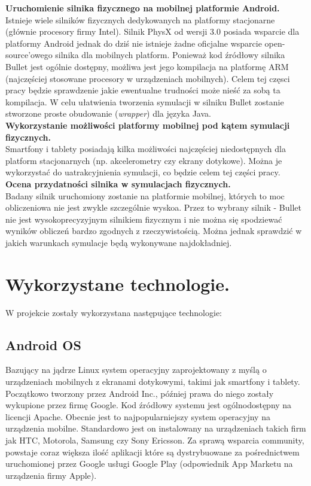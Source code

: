 \textbf{Uruchomienie silnika fizycznego na mobilnej platformie Android.}\\
Istnieje wiele silników fizycznych dedykowanych na platformy
stacjonarne (głównie procesory firmy Intel). Silnik PhysX od wersji 3.0
posiada wsparcie dla platformy Android jednak do dziś nie istnieje żadne
oficjalne wsparcie open-source'owego silnika dla mobilnych platform. Ponieważ
kod źródłowy silnika Bullet jest ogólnie dostępny, możliwa jest jego kompilacja
na platformę ARM (najczęściej stosowane procesory w urządzeniach mobilnych).
Celem tej częsci pracy będzie sprawdzenie jakie ewentualne trudności może nieść
za sobą ta kompilacja. W celu ułatwienia tworzenia symulacji w silniku Bullet
zostanie stworzone proste obudowanie (\emph{wrapper}) dla języka Java.\\

\textbf{Wykorzystanie możliwości platformy mobilnej pod kątem symulacji
fizycznych.}\\ Smartfony i tablety posiadają kilka możliwości
najczęściej niedostępnych dla platform stacjonarnych (np. akcelerometry czy
ekrany dotykowe). Można je wykorzystać do uatrakcyjnienia symulacji, co
będzie celem tej części pracy.\\

\textbf{Ocena przydatności silnika w symulacjach fizycznych.}\\ Badany
silnik uruchomiony zostanie na platformie mobilnej, których to moc obliczeniowa
nie jest zwykle szczególnie wyskoa. Przez to wybrany silnik - Bullet nie jest
wysokoprecyzyjnym silnikiem fizycznym i nie można się spodziewać wyników
obliczeń bardzo zgodnych z rzeczywistością. Można jednak sprawdzić w jakich
warunkach symulacje będą wykonywane najdokładniej.

\newpage
\section{Wykorzystane technologie.}
W projekcie zostały wykorzystana następujące technologie:

\subsection{Android OS}
Bazujący na jądrze Linux system operacyjny zaprojektowany z myślą o
urządzeniach mobilnych z ekranami dotykowymi, takimi jak smartfony i tablety.
Początkowo tworzony przez Android Inc., później prawa do niego zostały wykupione
przez firmę Google. Kod źródłowy systemu jest ogólnodostępny na licencji Apache. 
Obecnie jest to najpopularniejszy system operacyjny na urządzenia mobilne.
Standardowo jest on instalowany na urządzeniach takich firm jak HTC, Motorola,
Samsung czy Sony Ericsson. Za sprawą wsparcia community, powstaje coraz większa
ilość aplikacji które są dystrybuowane za pośrednictwem uruchomionej przez
Google usługi Google Play (odpowiednik App Marketu na urządzenia firmy Apple).

